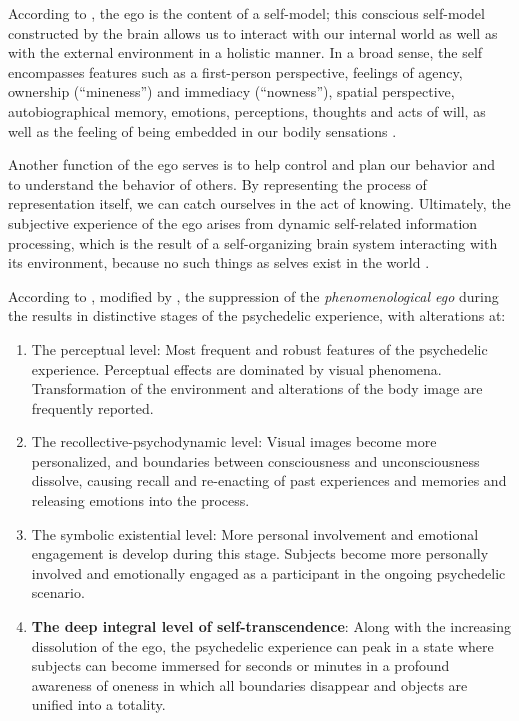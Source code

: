\begin{aquote}{\autocite{preller2016phenomenology}}
    According to \textcite{metzinger2009ego}, the ego is the content of a self-model; this conscious self-model constructed by the brain allows us to interact with our internal world as well as with the external environment in a holistic manner. In a broad sense, the self encompasses features such as a first-person perspective, feelings of agency, ownership (“mineness”) and immediacy (“nowness”), spatial perspective, autobiographical memory, emotions, perceptions, thoughts and acts of will, as well as the feeling of being embedded in our bodily sensations \autocites{metzinger2009ego}{northoff2011self}.

    Another function of the ego serves is to help control and plan our behavior and to understand the behavior of others. By representing the process of representation itself, we can catch ourselves in the act of knowing. Ultimately, the subjective experience of the ego arises from dynamic self-related information processing, which is the result of a self-organizing brain system interacting with its environment, because no such things as selves exist in the world \autocite{metzinger2009ego}.
\end{aquote}

According to \textcite{masters2000varieties}, modified by \textcite{preller2016phenomenology}, the suppression of the \textit{phenomenological ego} during the results in distinctive stages of the psychedelic experience, with alterations at:

\begin{enumerate}
    \setlength{\itemsep}{0pt}
    \setlength{\parskip}{0pt}
    \item The perceptual level: Most frequent and robust features of the psychedelic experience. Perceptual effects are dominated by visual phenomena. Transformation of the environment and alterations of the body image are frequently reported.
    \item The recollective-psychodynamic level: Visual images become more personalized, and boundaries between consciousness and unconsciousness dissolve, causing recall and re-enacting of past experiences and memories and releasing emotions into the process.
    \item The symbolic existential level: More personal involvement and emotional engagement is develop during this stage. Subjects become more personally involved and emotionally engaged as a participant in the ongoing psychedelic scenario.
    \item \textbf{The deep integral level of self-transcendence}: Along with the increasing dissolution of the ego, the psychedelic experience can peak in a state where subjects can become immersed for seconds or minutes in a profound awareness of oneness in which all boundaries disappear and objects are unified into a totality.
\end{enumerate}

